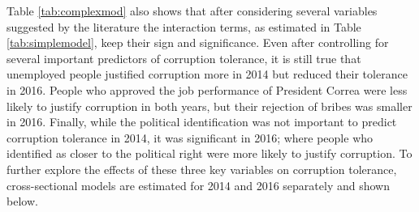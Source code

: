 \documentclass[12pt,a4]{article}\usepackage[]{graphicx}\usepackage[]{xcolor}
\begin{document}
Table \ref{tab:complexmod} also shows that after considering several variables suggested by the literature the interaction terms, as estimated in Table \ref{tab:simplemodel}, keep their sign and significance. Even after controlling for several important predictors of corruption tolerance, it is still true that unemployed people justified corruption more in 2014 but reduced their tolerance in 2016. People who approved the job performance of President Correa were less likely to justify corruption in both years, but their rejection of bribes was smaller in 2016. Finally, while the political identification was not important to predict corruption tolerance in 2014, it was significant in 2016; where people who identified as closer to the political right were more likely to justify corruption. To further explore the effects of these three key variables on corruption tolerance, cross-sectional models are estimated for 2014 and 2016 separately and shown below.
\end{document}
